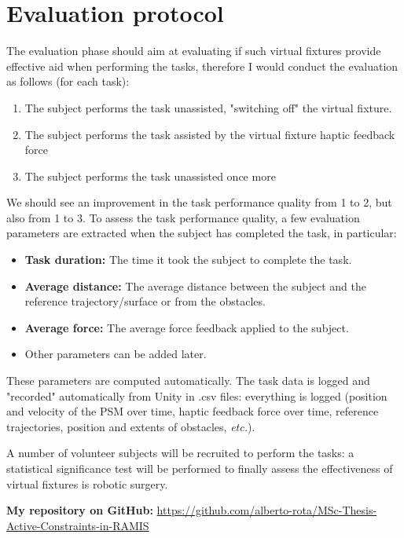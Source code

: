 \documentclass{article}
\begin{document}
\section*{Evaluation protocol}
The evaluation phase should aim at evaluating if such virtual fixtures provide effective aid when performing the tasks, therefore I would conduct the evaluation as follows (for each task):
\begin{enumerate}
    \item The subject performs the task unassisted, "switching off" the virtual fixture.
    \item The subject performs the task assisted by the virtual fixture haptic feedback force
    \item The subject performs the task unassisted once more
\end{enumerate}
We should see an improvement in the task performance quality from 1 to 2, but also from 1 to 3. To assess the task performance quality, a few evaluation parameters are extracted when the subject has completed the task, in particular:
\begin{itemize} 
    \item \textbf{Task duration:} The time it took the subject to complete the task.
    \item \textbf{Average distance:} The average distance between the subject and the reference trajectory/surface or from the obstacles.
    \item \textbf{Average force:} The average force feedback applied to the subject.
    \item Other parameters can be added later.
\end{itemize}
These parameters are computed automatically. The task data is logged and "recorded" automatically from Unity in .csv files: everything is logged (position and velocity of the PSM over time, haptic feedback force over time, reference trajectories, position and extents of obstacles, \textit{etc.}). 
\newline

\noindent A number of volunteer subjects will be recruited to perform the tasks: a statistical significance test will be performed to finally assess the effectiveness of virtual fixtures is robotic surgery.
\newline

\noindent \textbf{My repository on GitHub: }\href{https://github.com/alberto-rota/MSc-Thesis-Active-Constraints-in-RAMIS}{https://github.com/alberto-rota/MSc-Thesis-Active-Constraints-in-RAMIS}
\end{document}
